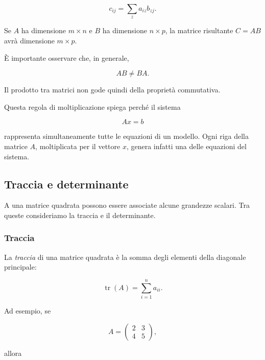 \begin{equation*}
c_{ij}=\sum_z a_{iz}b_{zj}.
\label{eq:prodotto_matrici}
\end{equation*}

Se $A$ ha dimensione $m\times n$ e $B$ ha dimensione $n\times p$,
la matrice risultante $C=AB$ avrà dimensione $m\times p$.

È importante osservare che, in generale,

\begin{equation*}
AB \neq BA.
\end{equation*}

Il prodotto tra matrici non gode quindi della proprietà commutativa.

Questa regola di moltiplicazione spiega perché il sistema

\begin{equation*}
Ax=b
\end{equation*}

rappresenta simultaneamente tutte le equazioni di un modello.
Ogni riga della matrice $A$, moltiplicata per il vettore $x$,
genera infatti una delle equazioni del sistema.


\subsection{Traccia e determinante}

A una matrice quadrata possono essere associate alcune grandezze
scalari. Tra queste consideriamo la traccia e il determinante.


\subsubsection{Traccia}

La \emph{traccia} di una matrice quadrata è la somma degli elementi
della diagonale principale:

\begin{equation*}
\operatorname{tr}(A)
=
\sum_{i=1}^{n}a_{ii}.
\end{equation*}

Ad esempio, se

\begin{equation*}
A=
\begin{pmatrix}
2 & 3 \\
4 & 5
\end{pmatrix},
\end{equation*}

allora

